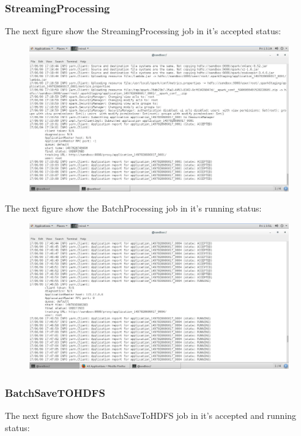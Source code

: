 \subsubsection{StreamingProcessing}
\label{sec:sec01}

The next figure show the StreamingProcessing job in it's accepted status:

\begin{figure}[h!]
	\centering
	\includegraphics[height=0.3\textheight]{fig01/StreamingProcessingAccepted}
	\label{fig:FilialesEtClients}
\end{figure}
\newpage
The next figure show the BatchProcessing job in it's running status:
\begin{figure}[h!]
	\centering
	\includegraphics[height=0.3\textheight]{fig01/StreamingProcessingRunning}
	\label{fig:FilialesEtClients}
\end{figure}
\subsubsection{BatchSaveTOHDFS}
\label{sec:sec01}
The next figure show the BatchSaveToHDFS job in it's accepted and running status:

